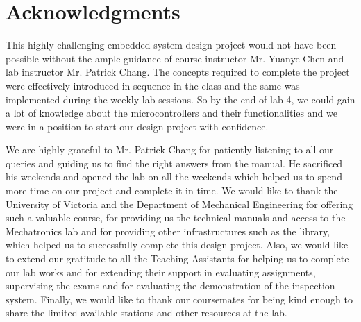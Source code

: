\section{Acknowledgments}\label{sec:intro}

This highly challenging embedded system design project would not have been possible without the ample guidance of course instructor Mr. Yuanye Chen and lab instructor Mr. Patrick Chang. The concepts required to complete the project were effectively introduced in sequence in the class and the same was implemented during the weekly lab sessions. So by the end of lab 4, we could gain a lot of knowledge about the microcontrollers and their functionalities and we were in a position to start our design project with confidence.

We are highly grateful to Mr. Patrick Chang for patiently listening to all our queries and guiding us to find the right answers from the manual. He sacrificed his weekends and opened the lab on all the weekends which helped us to spend more time on our project and complete it in time.
We would like to thank the University of Victoria and the Department of Mechanical Engineering for offering such a valuable course, for providing us the technical manuals and access to the Mechatronics lab and for providing other infrastructures such as the library, which helped us to successfully complete this design project.
Also, we would like to extend our gratitude to all the Teaching Assistants for helping us to complete our lab works and for extending their support in evaluating assignments, supervising the exams and for evaluating the demonstration of the inspection system. Finally, we would like to thank our coursemates for being kind enough to share the limited available stations and other resources at the lab.
